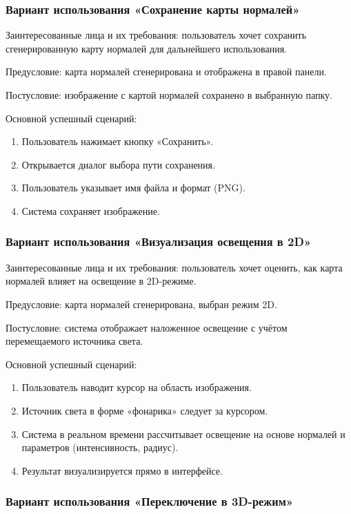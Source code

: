 \subsubsection{Вариант использования «Сохранение карты нормалей»}

Заинтересованные лица и их требования: пользователь хочет сохранить сгенерированную карту нормалей для дальнейшего использования.

Предусловие: карта нормалей сгенерирована и отображена в правой панели.

Постусловие: изображение с картой нормалей сохранено в выбранную папку.

Основной успешный сценарий:
\begin{enumerate}
	\item Пользователь нажимает кнопку «Сохранить».
	\item Открывается диалог выбора пути сохранения.
	\item Пользователь указывает имя файла и формат (PNG).
	\item Система сохраняет изображение.
\end{enumerate}
\subsubsection{Вариант использования «Визуализация освещения в 2D»}

Заинтересованные лица и их требования: пользователь хочет оценить, как карта нормалей влияет на освещение в 2D-режиме.

Предусловие: карта нормалей сгенерирована, выбран режим 2D.

Постусловие: система отображает наложенное освещение с учётом перемещаемого источника света.

Основной успешный сценарий:
\begin{enumerate}
	\item Пользователь наводит курсор на область изображения.
	\item Источник света в форме «фонарика» следует за курсором.
	\item Система в реальном времени рассчитывает освещение на основе нормалей и параметров (интенсивность, радиус).
	\item Результат визуализируется прямо в интерфейсе.
\end{enumerate}
\subsubsection{Вариант использования «Переключение в 3D-режим»}

